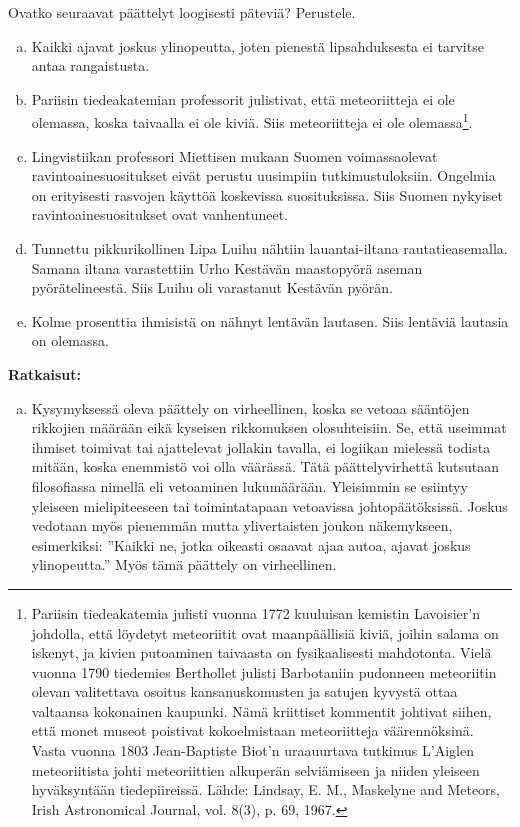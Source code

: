 \begin{esimerkki}
    Ovatko seuraavat päättelyt loogisesti päteviä? Perustele.
    \begin{enumerate}[a)]
        \item Kaikki ajavat joskus ylinopeutta, joten pienestä lipsahduksesta ei tarvitse antaa rangaistusta.
        \item Pariisin tiedeakatemian professorit julistivat, että meteoriitteja ei ole olemassa,
            koska taivaalla ei ole kiviä. Siis meteoriitteja ei ole olemassa\footnote{Pariisin tiedeakatemia julisti vuonna 1772 kuuluisan kemistin Lavoisier'n johdolla, että löydetyt meteoriitit ovat maanpäällisiä kiviä, joihin salama on iskenyt, ja kivien putoaminen taivaasta on fysikaalisesti mahdotonta. Vielä vuonna 1790 tiedemies Berthollet julisti Barbotaniin pudonneen meteoriitin olevan valitettava osoitus kansanuskomusten ja satujen kyvystä ottaa valtaansa kokonainen kaupunki. Nämä kriittiset kommentit johtivat siihen, että monet museot poistivat kokoelmistaan meteoriitteja väärennöksinä. Vasta vuonna 1803 Jean-Baptiste Biot'n uraauurtava tutkimus L'Aiglen meteoriitista johti meteoriittien alkuperän selviämiseen ja niiden yleiseen hyväksyntään tiedepiireissä. Lähde: Lindsay, E. M., Maskelyne and Meteors, Irish Astronomical Journal, vol. 8(3), p. 69, 1967.}. %
        \item Lingvistiikan professori Miettisen mukaan Suomen voimassaolevat ravintoainesuositukset eivät perustu uusimpiin tutkimustuloksiin. Ongelmia on erityisesti rasvojen käyttöä koskevissa suosituksissa. Siis Suomen nykyiset ravintoainesuositukset ovat vanhentuneet.
        \item Tunnettu pikkurikollinen Lipa Luihu nähtiin lauantai-iltana rautatieasemalla. Samana iltana varastettiin Urho Kestävän maastopyörä aseman pyörätelineestä. Siis Luihu oli varastanut Kestävän pyörän.
        \item Kolme prosenttia ihmisistä on nähnyt lentävän lautasen. Siis lentäviä lautasia on olemassa.
    \end{enumerate}
    \textbf{Ratkaisut:}
        \begin{enumerate}[a)]
            \item Kysymyksessä oleva päättely on virheellinen, koska se vetoaa sääntöjen rikkojien määrään eikä kyseisen rikkomuksen olosuhteisiin. Se, että useimmat ihmiset toimivat tai ajattelevat jollakin tavalla, ei logiikan mielessä todista mitään, koska enemmistö voi olla väärässä. Tätä päättelyvirhettä kutsutaan filosofiassa nimellä  eli vetoaminen lukumäärään. Yleisimmin se esiintyy yleiseen mielipiteeseen tai toimintatapaan vetoavissa johtopäätöksissä. Joskus vedotaan myös pienemmän mutta ylivertaisten joukon näkemykseen, esimerkiksi: ''Kaikki ne, jotka oikeasti osaavat ajaa autoa, ajavat joskus ylinopeutta.'' Myös tämä päättely on virheellinen.

\end{enumerate}
\end{esimerkki}
